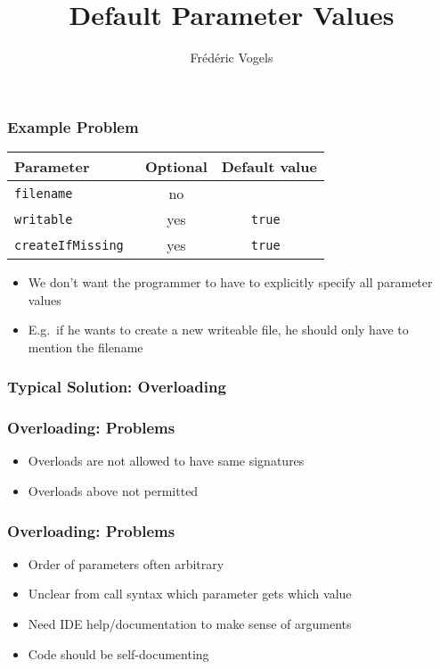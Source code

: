 

\usetikzlibrary{shadows,shapes.multipart}

\title{Default Parameter Values}
\author{Fr\'ed\'eric Vogels}


\lstset{language=c++14}




\begin{frame}
  \titlepage
\end{frame}

\begin{frame}
  \frametitle{Example Problem}
  \begin{center}
    \begin{tabular}{lcc}
      \textbf{Parameter} & \textbf{Optional} & \textbf{Default value} \\
      \toprule
      \tt filename & no & \\
      \tt writable & yes & \tt true \\
      \tt createIfMissing & yes & \tt true \\
    \end{tabular}
  \end{center}
  \begin{itemize}
    \item We don't want the programmer to have to explicitly specify all parameter values
    \item E.g.\ if he wants to create a new writeable file, he should only have to mention the filename
  \end{itemize}
\end{frame}

\begin{frame}
  \frametitle{Typical Solution: Overloading}
\end{frame}

\begin{frame}
  \frametitle{Overloading: Problems}
  \begin{itemize}
    \item Overloads are not allowed to have same signatures
    \item Overloads above not permitted
  \end{itemize}
\end{frame}

\begin{frame}
  \frametitle{Overloading: Problems}
  \begin{itemize}
    \item Order of parameters often arbitrary
    \item Unclear from call syntax which parameter gets which value
    \item Need IDE help/documentation to make sense of arguments
    \item Code should be self-documenting
  \end{itemize}
\end{frame}

